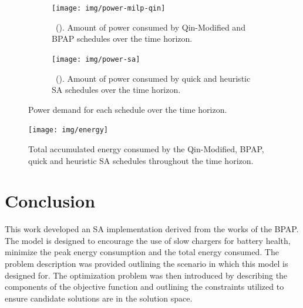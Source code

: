 \documentclass[energies,article,submit,moreauthors]{Definitions/mdpi}
\newcommand\mysubcaption[1]{\phantomcaption%
\caption*{\figurename~\thefigure(\thesubfigure). #1}}
\begin{document}
\begin{figure}
  \begin{subfigure}[t]{\textwidth}
    \centering
    \texttt{[image: img/power-milp-qin]}
    \mysubcaption{Amount of power consumed by Qin-Modified and BPAP schedules over the time horizon.}
    \label{fig:power-usage-milp-qin}
  \end{subfigure}

  \hfill

  \begin{subfigure}[t]{\textwidth}
    \centering
    \texttt{[image: img/power-sa]}
    \mysubcaption{Amount of power consumed by quick and heuristic SA schedules over the time horizon.}
    \label{fig:power-usage-sa}
  \end{subfigure}
  \caption{Power demand for each schedule over the time horizon.}
  \label{fig:power}
\end{figure}

\begin{figure}[htpb]
\centering \texttt{[image: img/energy]}
    \caption{Total accumulated energy consumed by the Qin-Modified, BPAP, quick and heuristic SA schedules throughout the time horizon.}
    \label{fig:energy-usage}
\end{figure}

\section{Conclusion}
\label{sec:sa-conclusion}
This work developed an SA implementation derived from the works of the BPAP. The model is designed to encourage the use
of slow chargers for battery health, minimize the peak energy consumption and the total energy consumed. The problem
description was provided outlining the scenario in which this model is designed for. The optimization problem was then
introduced by describing the components of the objective function and outlining the constraints utilized to ensure
candidate solutions are in the solution space.
\end{document}
